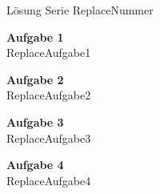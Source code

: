 \documentclass{article}
\begin{document}
\thispagestyle{empty}


\begin{center}
{\large Lösung Serie ReplaceNummer}\\
\end{center}
\vspace{4em}

{\bf Aufgabe 1}\\[0.5em]

ReplaceAufgabe1


\vspace{2em}

{\bf Aufgabe 2 }\\[0.5em]

ReplaceAufgabe2


\vspace{2em}

{\bf Aufgabe 3 }\\[0.5em]

ReplaceAufgabe3


\vspace{2em}

{\bf Aufgabe 4 }\\[0.5em]

ReplaceAufgabe4
\end{document}
